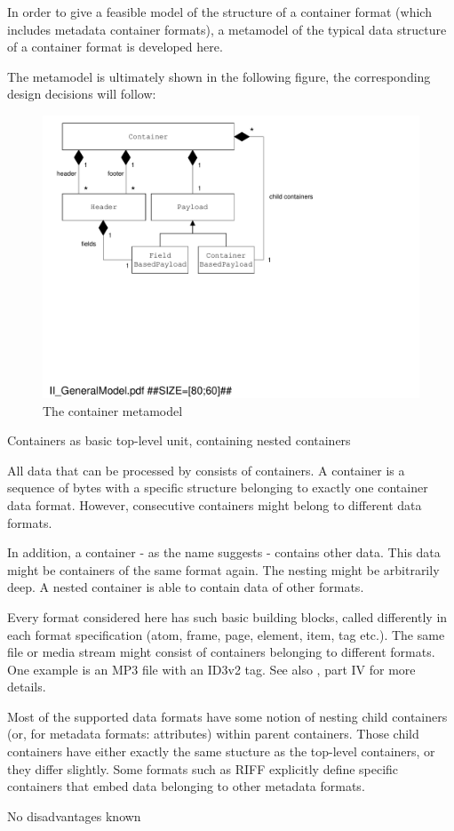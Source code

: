 In order to give a feasible model of the structure of a container format (which includes metadata container formats), a metamodel of the typical data structure of a container format is developed here. 

The metamodel is ultimately shown in the following figure, the corresponding design decisions will follow:

\begin{figure}[htbp]
\centering
\includegraphics[width=1.00\linewidth]{figures/II_GeneralModel.pdf}
\caption{The container metamodel}
\label{fig:II_GeneralModel}
\end{figure}

{%
Containers as basic top-level unit, containing nested containers
}
{%
All data that can be processed by \LibName{} consists of containers. A container is a sequence of bytes with a specific structure belonging to exactly one container data format. However, consecutive containers might belong to different data formats.

In addition, a container - as the name suggests - contains other data. This data might be containers of the same format again. The nesting might be arbitrarily deep. A nested container is able to contain data of other formats. 
}
{%
Every format considered here has such basic building blocks, called differently in each format specification (atom, frame, page, element, item, tag etc.). The same file or media stream might consist of containers belonging to different formats. One example is an MP3 file with an ID3v2 tag. See also \cite{MC17}, part IV for more details.

Most of the supported data formats have some notion of nesting child containers (or, for metadata formats: attributes) within parent containers. Those child containers have either exactly the same stucture as the top-level containers, or they differ slightly. Some formats such as RIFF explicitly define specific containers that embed data belonging to other metadata formats. 
}
{%
No disadvantages known
}

